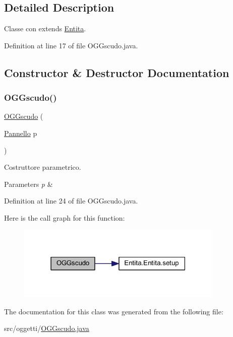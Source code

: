 \subsection{Detailed Description}
Classe con extends \hyperlink{namespace_entita}{Entita}. 

Definition at line 17 of file O\+G\+Gscudo.\+java.



\subsection{Constructor \& Destructor Documentation}
\mbox{\label{classoggetti_1_1_o_g_gscudo_a21b65d2d8342c79e0340781948808f20}} 
\subsubsection{\texorpdfstring{O\+G\+Gscudo()}{OGGscudo()}}
{\footnotesize\ttfamily \hyperlink{classoggetti_1_1_o_g_gscudo}{O\+G\+Gscudo} (\begin{DoxyParamCaption}\item[{\hyperlink{classa_1_1survival_1_1game_1_1_pannello}{Pannello}}]{p }\end{DoxyParamCaption})}



Costruttore parametrico. 


\begin{DoxyParams}{Parameters}
{\em p} & \\
\hline
\end{DoxyParams}


Definition at line 24 of file O\+G\+Gscudo.\+java.

Here is the call graph for this function\+:
\nopagebreak
\begin{figure}[H]
\begin{center}
\leavevmode
\includegraphics[width=279pt]{classoggetti_1_1_o_g_gscudo_a21b65d2d8342c79e0340781948808f20_cgraph}
\end{center}
\end{figure}


The documentation for this class was generated from the following file\+:\begin{DoxyCompactItemize}
\item 
src/oggetti/\hyperlink{_o_g_gscudo_8java}{O\+G\+Gscudo.\+java}\end{DoxyCompactItemize}
